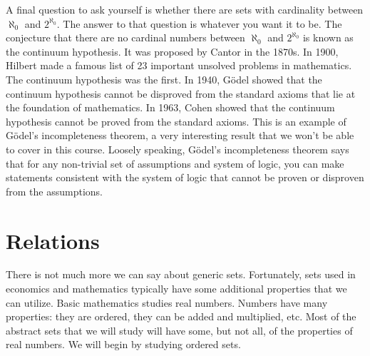 A final question to ask yourself is whether there are sets with
cardinality between $\aleph_0$ and $2^{\aleph_0}$. The answer to that
question is whatever you want it to be. The conjecture that there are
no cardinal numbers between $\aleph_0$ and $2^{\aleph_0}$ is known as
the continuum hypothesis. It was proposed by Cantor in the 1870s. In
1900, Hilbert made a famous list of 23 important unsolved problems in
mathematics. The continuum hypothesis was the first. In 1940,
G\"{o}del showed that the continuum hypothesis cannot be disproved
from the standard axioms that lie at the foundation of mathematics.
In 1963, Cohen showed that the continuum hypothesis cannot be proved
from the standard axioms. This is an example of G\"{o}del's
incompleteness theorem, a very interesting result that we won't be
able to cover in this course. Loosely speaking, G\"{o}del's
incompleteness theorem says that for any non-trivial set of
assumptions and system of logic, you can make statements consistent
with the system of logic that cannot be proven or disproven from the
assumptions.


\section{Relations \label{s:relations}}

There is not much more we can say about generic sets. Fortunately,
sets used in economics and mathematics typically have some additional
properties that we can utilize. Basic mathematics studies real
numbers. Numbers have many properties: they are ordered, they can be
added and multiplied, etc. Most of the abstract sets that we will
study will have some, but not all, of the properties of real
numbers. We will begin by studying ordered sets. 

